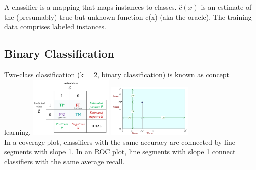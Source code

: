 \documentclass[cheatsheet.tex]{subfiles}
\begin{document}
A classifier is a mapping that maps instances to classes. $\hat{c}(x)$ is an estimate of the (presumably) true but unknown function c(x) (aka the oracle). The training data comprises labeled instances. 
\subsection{Binary Classification}
Two-class classification (k = 2, binary classification) is known as concept learning. 
\includegraphics[width=40mm]{contingency_table.png}
\includegraphics[width=40mm]{coverage_plot.png}
\\
In a coverage plot, classifiers with the same accuracy are connected by line segments with slope 1. In an ROC plot, line segments with slope 1 connect classifiers with the same average recall. 
\end{document}
